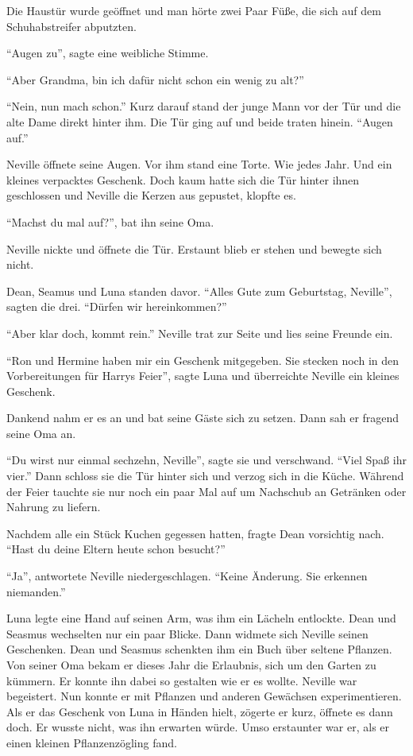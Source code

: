 Die Haustür wurde geöffnet und man hörte zwei Paar Füße, die sich auf dem Schuhabstreifer abputzten.

\enquote{Augen zu}, sagte eine weibliche Stimme.

\enquote{Aber Grandma, bin ich dafür nicht schon ein wenig zu alt?}

\enquote{Nein, nun mach schon.} Kurz darauf stand der junge Mann vor der Tür und die alte Dame direkt hinter ihm.  Die Tür ging auf und beide traten hinein. \enquote{Augen auf.}

Neville öffnete seine Augen. Vor ihm stand eine Torte. Wie jedes Jahr. Und ein kleines verpacktes Geschenk. Doch kaum hatte sich die Tür hinter ihnen geschlossen und Neville die Kerzen aus gepustet, klopfte es.

\enquote{Machst du mal auf?}, bat ihn seine Oma. 

Neville nickte und öffnete die Tür. Erstaunt blieb er stehen und bewegte sich nicht. 

Dean, Seamus und Luna standen davor. \enquote{Alles Gute zum Geburtstag, Neville}, sagten die drei. \enquote{Dürfen wir hereinkommen?}

\enquote{Aber \gst klar doch, kommt rein.} Neville trat zur Seite und lies seine Freunde ein.

\enquote{Ron und Hermine haben mir ein Geschenk mitgegeben. Sie stecken noch in den Vorbereitungen für Harrys Feier}, sagte Luna und überreichte Neville ein kleines Geschenk.

Dankend nahm er es an und bat seine Gäste sich zu setzen. Dann sah er fragend seine Oma an.

\enquote{Du wirst nur einmal sechzehn, Neville}, sagte sie und verschwand. \enquote{Viel Spaß ihr vier.} Dann schloss sie die Tür hinter sich und verzog sich in die Küche. Während der Feier tauchte sie nur noch ein paar Mal auf um Nachschub an Getränken oder Nahrung zu liefern.

Nachdem alle ein Stück Kuchen gegessen hatten, fragte Dean vorsichtig nach. \enquote{Hast du deine Eltern heute schon besucht?}

\enquote{Ja}, antwortete Neville niedergeschlagen. \enquote{Keine Änderung. Sie erkennen niemanden.}

Luna legte eine Hand auf seinen Arm, was ihm ein Lächeln entlockte. Dean und Seasmus wechselten nur ein paar Blicke. Dann widmete sich Neville seinen Geschenken. Dean und Seasmus schenkten ihm ein Buch über seltene Pflanzen. Von seiner Oma bekam er dieses Jahr die Erlaubnis, sich um den Garten zu kümmern. Er konnte ihn dabei so gestalten wie er es wollte. Neville war begeistert. Nun konnte er mit Pflanzen und anderen Gewächsen experimentieren. Als er das Geschenk von Luna in Händen hielt, zögerte er kurz, öffnete es dann doch. Er wusste nicht, was ihn erwarten würde. Umso erstaunter war er, als er einen kleinen Pflanzenzögling fand.

